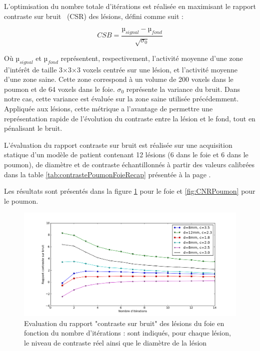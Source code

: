 L'optimisation du nombre totale d'itérations est réalisée en maximisant le rapport contraste sur bruit~\cite{takahara2004diffusion} (CSR) des lésions, défini comme suit :

\begin{equation}
 CSB = \frac{µ_{signal} - µ_{fond}}{\sqrt{\sigma_0}}
\end{equation}

Où $µ_{signal}$ et $µ_{fond}$ représentent, respectivement, l'activité moyenne d'une zone d'intérêt de taille 3$\times$3$\times$3 voxels centrée sur une lésion, et l'activité moyenne d'une zone saine. Cette zone correspond à un volume de 200 voxels dans le poumon et de 64 voxels dans le foie. $\sigma_0$ représente la variance du bruit. Dans notre cas, cette variance est évaluée sur la zone saine utilisée précédemment. Appliquée aux lésions, cette métrique a l'avantage de permettre une représentation rapide de l'évolution du contraste entre la lésion et le fond, tout en pénalisant le bruit.

L'évaluation du rapport contraste sur bruit est réalisée sur une acquisition statique d'un modèle de patient contenant 12 lésions (6 dans le foie et 6 dans le poumon), de diamètre et de contraste échantillonnés à partir des valeurs calibrées dans la table \ref{tab:contrastePoumonFoieRecap} présentée à la page \pageref{tab:contrastePoumonFoieRecap}.

Les résultats sont présentés dans la figure \ref{fig:CNRFoie} pour le foie et \ref{fig:CNRPoumon} pour le poumon.

\begin{figure}
\centering
\includegraphics[width=17cm]{images/CNRFoie}
\caption[Evaluation du rapport contraste sur bruit des lésions du foie en fonction du nombre d'itérations]{Evaluation du rapport "contraste sur bruit" des lésions du foie en fonction du nombre d'itérations : sont indiqués, pour chaque lésion, le niveau de contraste réel ainsi que le diamètre de la lésion}
\label{fig:CNRFoie}
\end{figure}


